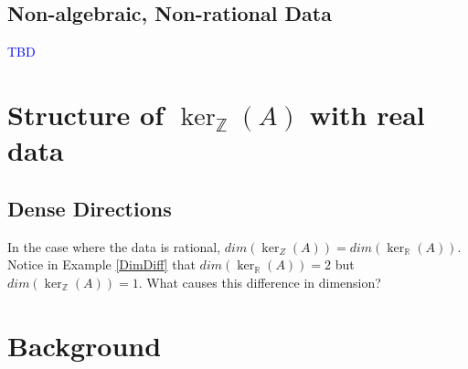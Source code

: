 \documentclass{article}
\newcommand{\Z}[0]{\mathbb{Z}}		%
\newcommand{\R}[0]{\mathbb{R}}		%
\theoremstyle{definition}
\theoremstyle{remark}
\begin{document}
\subsection{Non-algebraic, Non-rational Data}
\textcolor{blue}{TBD}
\section{Structure of $\ker_\Z(A)$ with real data}
\subsection{Dense Directions}
In the case where the data is rational, $dim(\ker_Z(A)) = dim(\ker_\R(A))$. Notice in Example \ref{DimDiff} that $dim(\ker_\R(A))=2$ but $dim(\ker_\Z(A))=1$. What causes this difference in dimension? 

\section{Background}
\end{document}
